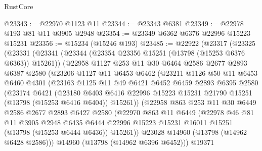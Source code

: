 \begin{lexlean}{RustCore}
\begin{coremodule}
@23343 := @22970 @1123 @11
@23344 := @23343 @6381
@23349 := @22978 @193 @81 @11 @3905 @2948
@23354 := @23349 @6362 @6376 @22996 @15223 @15231
@23356 := @15234 (@15246 @193)
@23485 := @22922
    (@23317
      (@23325
        (@23331
          (@23341
            (@23344 (@23354 @23356 @15251 (@13798 (@15253 @6376 @6363)) @15261))
            (@22958
              @1127
              @253
              @11
              @30
              @6464
              @2586
              @2677
              @2893
              @6387
              @2580
              (@23206
                @1127
                @11
                @6453
                @6462
                (@23211
                  @1126
                  @50
                  @11
                  @6453
                  @6460
                  @4301
                  (@23163
                    @1125
                    @11
                    @49
                    @6421
                    @6452
                    @6459
                    @2893
                    @6395
                    @2580
                    (@23174
                      @6421
                      (@23180
                        @6403
                        @6416
                        @22996
                        @15223
                        @15231
                        @21790
                        @15251
                        (@13798 (@15253 @6416 @6404))
                        @15261))
                    (@22958
                      @863
                      @253
                      @11
                      @30
                      @6449
                      @2586
                      @2677
                      @2893
                      @6427
                      @2580
                      (@22970
                        @863
                        @11
                        @6449
                        (@22978
                          @46
                          @81
                          @11
                          @3905
                          @2948
                          @6435
                          @6444
                          @22996
                          @15223
                          @15231
                          @16011
                          @15251
                          (@13798 (@15253 @6444 @6436))
                          @15261))
                      @23028
                      @14960
                      (@13798 (@14962 @6428 @2586)))
                    @14960
                    (@13798 (@14962 @6396 @6452)))
                  @19371

\end{coremodule}
\end{lexlean}
